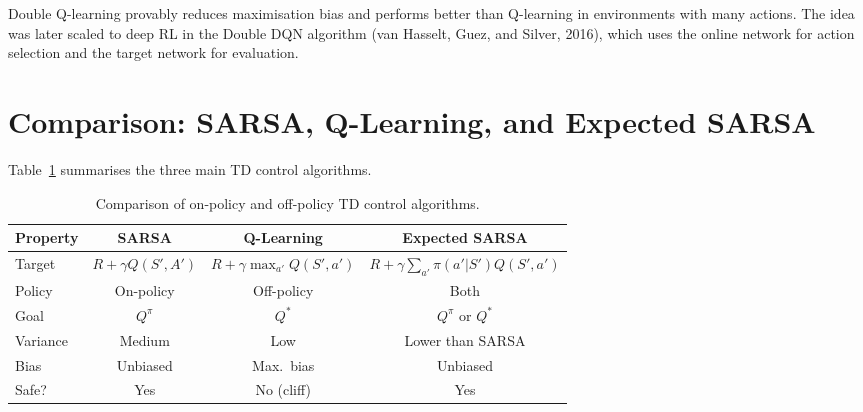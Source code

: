 Double Q-learning provably reduces maximisation bias and performs better than Q-learning in environments with many actions.  The idea was later scaled to deep RL in the Double DQN algorithm (van Hasselt, Guez, and Silver, 2016), which uses the online network for action selection and the target network for evaluation.

\section{Comparison: SARSA, Q-Learning, and Expected SARSA}
\label{sec:td-control-comparison}

Table~\ref{tab:td-control-comparison} summarises the three main TD control algorithms.

\begin{table}[ht]
\centering
\caption{Comparison of on-policy and off-policy TD control algorithms.}
\label{tab:td-control-comparison}
\small
\begin{tabular}{@{}lccc@{}}
\toprule
\textbf{Property} & \textbf{SARSA} & \textbf{Q-Learning} & \textbf{Expected SARSA}\\
\midrule
Target & $R\!+\!\gamma Q(S',A')$ & $R\!+\!\gamma\max_{a'}Q(S',a')$ & $R\!+\!\gamma\!\sum_{a'}\pi(a'|S')Q(S',a')$\\
Policy & On-policy & Off-policy & Both\\
Goal & $Q^\pi$ & $Q^*$ & $Q^\pi$ or $Q^*$\\
Variance & Medium & Low & Lower than SARSA\\
Bias & Unbiased & Max.~bias & Unbiased\\
Safe? & Yes & No (cliff) & Yes\\
\bottomrule
\end{tabular}
\end{table}

